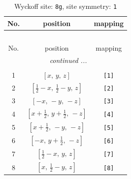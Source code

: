 \documentclass[fleqn,8pt]{jsarticle}
\begin{document}
\renewcommand{\arraystretch}{1.2}
\begin{longtable}{ccc}
\caption{Wyckoff site: {\tt 8g}, site symmetry: {\tt 1}}
 \\
 \hline \hline
No. & position & mapping \\ \hline \endfirsthead

\multicolumn{2}{l}{\tablename\ \thetable{}} \\
 \hline \hline
No. & position & mapping \\ \hline \endhead

 \hline \hline
\multicolumn{2}{r}{\footnotesize\it continued ...} \\ \endfoot

 \hline \hline
\multicolumn{2}{r}{} \\ \endlastfoot

1 & $\left[ x,\, y,\, z \right]$ & {\tt [1]} \\ \hline
2 & $\left[ \frac{1}{2} - x,\, \frac{1}{2} - y,\, z \right]$ & {\tt [2]} \\ \hline
3 & $\left[ - x,\, - y,\, - z \right]$ & {\tt [3]} \\ \hline
4 & $\left[ x + \frac{1}{2},\, y + \frac{1}{2},\, - z \right]$ & {\tt [4]} \\ \hline
5 & $\left[ x + \frac{1}{2},\, - y,\, - z \right]$ & {\tt [5]} \\ \hline
6 & $\left[ - x,\, y + \frac{1}{2},\, - z \right]$ & {\tt [6]} \\ \hline
7 & $\left[ \frac{1}{2} - x,\, y,\, z \right]$ & {\tt [7]} \\ \hline
8 & $\left[ x,\, \frac{1}{2} - y,\, z \right]$ & {\tt [8]} \\
\end{longtable}
\end{document}
